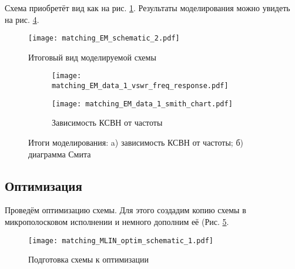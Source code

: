 Схема приобретёт вид как на рис. \ref{fig:matching_EM_schematic_2}. Результаты моделирования можно увидеть на рис. \ref{fig:matching_EM_data_1}.
\begin{figure}[!ht]
    \centering
    \texttt{[image: matching\_EM\_schematic\_2.pdf]}
    \caption{Итоговый вид моделируемой схемы}
    \label{fig:matching_EM_schematic_2}
\end{figure}
\begin{figure}[!ht]
    \centering
    \begin{subfigure}[b]{0.45\textwidth}
        \centering
        \texttt{[image: matching\_EM\_data\_1\_vswr\_freq\_response.pdf]}
        \caption{}
        \label{fig:matching_EM_data_1_vswr_freq_response}
    \end{subfigure}
    \hfill
    \begin{subfigure}[b]{0.45\textwidth}
        \centering
        \texttt{[image: matching\_EM\_data\_1\_smith\_chart.pdf]}
        \caption{Зависимость КСВН от частоты}
        \label{fig:matching_EM_data_1_smith_chart}
    \end{subfigure}
    \caption{
        Итоги моделирования:
        a) зависимость КСВН от частоты;
        б) диаграмма Смита
    }
    \label{fig:matching_EM_data_1}
\end{figure}

\subsection{Оптимизация}

Проведём оптимизацию схемы. Для этого создадим копию схемы в микрополосковом исполнении и немного дополним её (Рис. \ref{fig:matching_MLIN_optim_schematic_1}.

\begin{figure}
    \centering
    \texttt{[image: matching\_MLIN\_optim\_schematic\_1.pdf]}
    \caption{Подготовка схемы к оптимизации}
    \label{fig:matching_MLIN_optim_schematic_1}
\end{figure}
